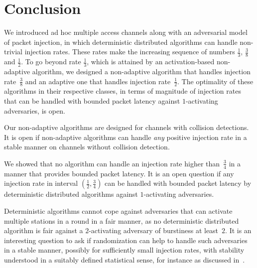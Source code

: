 \documentclass[11pt]{article}
\begin{document}
\section{Conclusion}



We introduced ad hoc multiple access channels along with an adversarial model of packet injection,  in which deterministic distributed algorithms can handle non-trivial injection rates.
These rates make the increasing sequence of numbers $\frac{1}{3}$, $\frac{3}{8}$ and $\frac{1}{2}$.
To go beyond rate $\frac{1}{3}$, which is attained by an activation-based non-adaptive algorithm, we designed a non-adaptive algorithm that handles injection rate~$\frac{3}{8}$ and an adaptive one  that handles injection rate~$\frac{1}{2}$.
The optimality of these algorithms in their respective classes, in terms of magnitude of injection rates  that can be  handled with bounded packet latency against $1$-activating adversaries, is open.

Our non-adaptive algorithms are designed for channels with collision detections.
It is open if non-adaptive algorithms can handle \emph{any} positive injection rate in a stable manner on channels without collision detection.

We showed that no algorithm can handle an injection rate higher than~$\frac{3}{4}$ in a manner that provides bounded packet latency.
It is an open question if any injection rate in interval $(\frac{1}{2},\frac{3}{4})$ can be handled with bounded packet latency by deterministic distributed algorithms against $1$-activating adversaries.

Deterministic algorithms cannot cope against adversaries that can activate multiple stations in a round in a fair manner, as no deterministic distributed algorithm is fair against a $2$-activating adversary of burstiness at least~$2$.
It is an interesting question to ask if randomization can help to handle such adversaries in a stable manner, possibly for sufficiently small injection rates, with stability understood in a suitably defined statistical sense,  for instance as discussed in~\cite{Chlebus-randomized-radio-chapter-2001}.

\pagebreak






\end{document}
